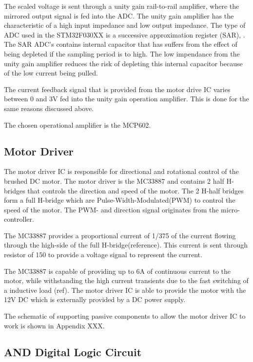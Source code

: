 \documentclass[a4paper,12pt]{article}
\begin{document}
	The scaled voltage is sent through a unity gain rail-to-rail amplifier, where the mirrored output signal is fed into the ADC. The unity gain amplifier has the characteristic of a high input impedance and low output impedance. The type of ADC used in the STM32F030XX is a successive approximation register (SAR), \cite{stm32_ADC:2017}. The SAR ADC's contains internal capacitor that has suffers from the effect of being depleted if the sampling period is to high. The low impendance from the unity gain amplifier reduces the risk of depleting this internal capacitor because of the low current being pulled.
	
	The current feedback signal that is provided from the motor drive IC varies between 0 and 3V fed into the unity gain operation amplifier. This is done for the same reasons discussed above.
	
	The chosen operational amplifier is the MCP602. 
	
	\subsection{Motor Driver}
	
	The motor driver IC is responsible for directional and rotational control of the brushed DC motor. The motor driver is the MC33887 and contains 2 half H-bridges that controls the direction and speed of the motor. The 2 H-half bridges form a full H-bridge which are Pulse-Width-Modulated(PWM) to control the speed of the motor. The PWM- and direction signal originates from the micro-controller. 
	
	The MC33887 provides a proportional current of 1/375 of the current flowing through the high-side of the full H-bridge(reference). This current is sent through resistor of \SI{150}{\Omega} to provide a voltage signal to represent the current.
	
	The MC33887 is capable of providing up to 6A of continuous current to the motor, while withstanding the high current transients due to the fast switching of a inductive load (ref). The motor driver IC is able to provide the motor with the 12V DC which is externally provided by a DC power supply.
	
	The schematic of supporting passive components to allow the motor driver IC to work is shown in Appendix XXX.
	
	\subsection{AND Digital Logic Circuit}
	
\end{document}
